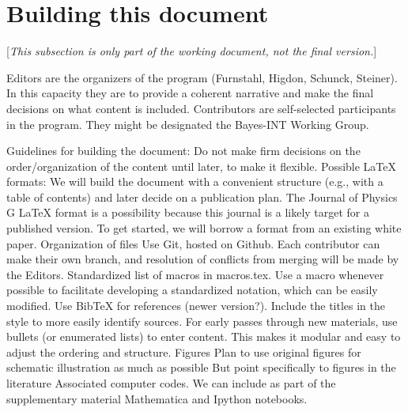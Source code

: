 
\section*{Building this document}

[\emph{This subsection is only part of the working document, not the final version.}]

\bi
  \I Editors are the organizers of the program (Furnstahl, Higdon, Schunck, Steiner).
     In this capacity they are to provide a coherent narrative and make the final decisions
     on what content is included.
  \I Contributors are self-selected participants in the program.  They might be designated
      the Bayes-INT Working Group.
\ei


Guidelines for building the document:
\bi
  \I Do not make firm decisions on the order/organization of the content until later,
      to make it flexible.
  \I Possible LaTeX formats:
     \bi
       \I We will build the document with a convenient structure (e.g., with
          a table of contents) and later decide on a publication plan.
       \I The Journal of Physics G LaTeX format is a possibility because this journal is a
       likely target for a published version.
       \I To get started, we will borrow a format from an existing white paper.
     \ei
  \I Organization of files
     \bi
       \I Use Git, hosted on Github.  Each contributor can make their own branch, and
          resolution of conflicts from merging will be made by the Editors.
       \I Standardized list of macros in macros.tex.  Use a macro whenever possible to
          facilitate developing a standardized notation, which can be easily modified.
       \I Use BibTeX for references (newer version?).  Include the titles in the style
           to more easily identify sources.
       \I For early passes through new materials, use bullets (or enumerated lists) to enter content.    This makes it modular and easy to adjust the ordering and structure.
     \ei
  \I Figures
     \bi
       \I Plan to use original figures for schematic illustration as much as possible
       \I But point specifically to figures in the literature
     \ei
  \I Associated computer codes.  We can include as part of the supplementary material
      Mathematica and Ipython notebooks.
\ei

